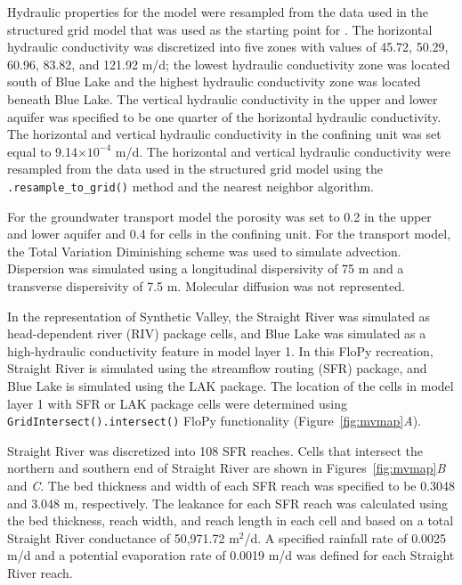 \documentclass[11pt, oneside]{article}  	%
\begin{document}
Hydraulic properties for the model were resampled from the data used in the structured grid model that was used as the starting point for \cite{hill1998} \citep{pollock2014percomm}. The horizontal hydraulic conductivity was discretized into five zones with values of 45.72, 50.29, 60.96, 83.82, and 121.92 m/d; the lowest hydraulic conductivity zone was located south of Blue Lake and the highest hydraulic conductivity zone was located beneath Blue Lake. The vertical hydraulic conductivity in the upper and lower aquifer was specified to be one quarter of the horizontal hydraulic conductivity. The horizontal and vertical hydraulic conductivity in the confining unit was set equal to 9.14$\times10^{-4}$ m/d. The horizontal and vertical hydraulic conductivity  were resampled from the data used in the structured grid model using the \texttt{.resample\_to\_grid()} method and the nearest neighbor algorithm.

For the groundwater transport model the porosity was set to 0.2 in the upper and lower aquifer and 0.4 for cells in the confining unit.  For the transport model, the Total Variation Diminishing scheme was used to simulate advection.  Dispersion was simulated using a longitudinal dispersivity of 75 m and a transverse dispersivity of 7.5 m.  Molecular diffusion was not represented.

In the \cite{hill1998} representation of Synthetic Valley, the Straight River was simulated as head-dependent river (RIV) package cells, and Blue Lake was simulated as a high-hydraulic conductivity feature in model layer 1. In this FloPy recreation, Straight River is simulated using the streamflow routing (SFR) package, and Blue Lake is simulated using the LAK package. The location of the cells in model layer 1 with SFR or LAK package cells were determined using \texttt{GridIntersect().intersect()} FloPy functionality (Figure~\ref{fig:mvmap}\textit{A}). 

Straight River was discretized into 108 SFR reaches. Cells that intersect the northern and southern end of Straight River are shown in Figures~\ref{fig:mvmap}\textit{B} and \textit{C}. The bed thickness and  width of each SFR reach was specified to be 0.3048 and 3.048 m, respectively. The leakance for each SFR reach was calculated using the bed thickness, reach width, and reach length in each cell and based on a total Straight River conductance of 50,971.72 m$^2$/d. A specified rainfall rate of 0.0025 m/d and a potential evaporation rate of  0.0019 m/d was defined for each Straight River reach.
\end{document}
